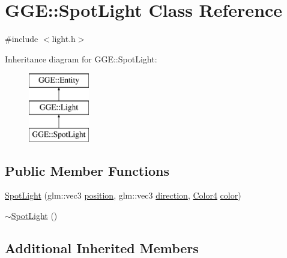 \hypertarget{class_g_g_e_1_1_spot_light}{\section{G\+G\+E\+:\+:Spot\+Light Class Reference}
\label{class_g_g_e_1_1_spot_light}
}


{\ttfamily \#include $<$light.\+h$>$}

Inheritance diagram for G\+G\+E\+:\+:Spot\+Light\+:\begin{figure}[H]
\begin{center}
\leavevmode
\includegraphics[height=3.000000cm]{class_g_g_e_1_1_spot_light}
\end{center}
\end{figure}
\subsection*{Public Member Functions}
\begin{DoxyCompactItemize}
\item 
\hyperlink{class_g_g_e_1_1_spot_light_a8cdfd89df0adae186c0a6e04adc03863}{Spot\+Light} (glm\+::vec3 \hyperlink{class_g_g_e_1_1_entity_a38a9fa01bfaf37ca415181ba6a179d3f}{position}, glm\+::vec3 \hyperlink{class_g_g_e_1_1_entity_a80c69365314541244f26e4a15b4223d8}{direction}, \hyperlink{namespace_g_g_e_aff43741fd756c83cbfd5d4d5cd9fcf41}{Color4} \hyperlink{class_g_g_e_1_1_light_a4d2f4605abc44637feac0d0312ce0717}{color})
\item 
\hyperlink{class_g_g_e_1_1_spot_light_ab08bdaac4b7a936c1af0401f9ba31295}{$\sim$\+Spot\+Light} ()
\end{DoxyCompactItemize}
\subsection*{Additional Inherited Members}


